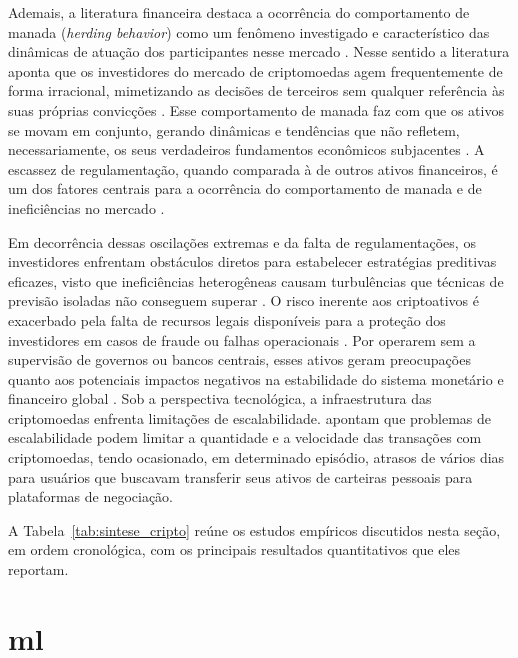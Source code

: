 Ademais, a literatura financeira destaca a ocorrência do comportamento de manada (\textit{herding behavior}) como um fenômeno investigado e característico das dinâmicas de atuação dos participantes nesse mercado \cite{ballis2020herding}. Nesse sentido a literatura aponta que os investidores do mercado de criptomoedas agem frequentemente de forma irracional, mimetizando as decisões de terceiros sem qualquer referência às suas próprias convicções \cite{ballis2020herding}. Esse comportamento de manada faz com que os ativos se movam em conjunto, gerando dinâmicas e tendências que não refletem, necessariamente, os seus verdadeiros fundamentos econômicos subjacentes \cite{ballis2020herding}. A escassez de regulamentação, quando comparada à de outros ativos financeiros, é um dos fatores centrais para a ocorrência do comportamento de manada e de ineficiências no mercado \cite{park2023intelligent}. 

Em decorrência dessas oscilações extremas e da falta de regulamentações, os investidores enfrentam obstáculos diretos para estabelecer estratégias preditivas eficazes, visto que ineficiências heterogêneas causam turbulências que técnicas de previsão isoladas não conseguem superar \cite{park2023intelligent}. O risco inerente aos criptoativos é exacerbado pela falta de recursos legais disponíveis para a proteção dos investidores em casos de fraude ou falhas operacionais \cite{charfeddine2020investigating}. Por operarem sem a supervisão de governos ou bancos centrais, esses ativos geram preocupações quanto aos potenciais impactos negativos na estabilidade do sistema monetário e financeiro global \cite{charfeddine2020investigating}. Sob a perspectiva tecnológica, a infraestrutura das criptomoedas enfrenta limitações de escalabilidade.  apontam que problemas de escalabilidade podem limitar a quantidade e a velocidade das transações com criptomoedas, tendo ocasionado, em determinado episódio, atrasos de vários dias para usuários que buscavam transferir seus ativos de carteiras pessoais para plataformas de negociação.

A Tabela~\ref{tab:sintese_cripto} reúne os estudos empíricos discutidos nesta seção, em ordem cronológica, com os principais resultados quantitativos que eles reportam.



\section{\Acl{ml}}
\label{sec_machine_learning}

